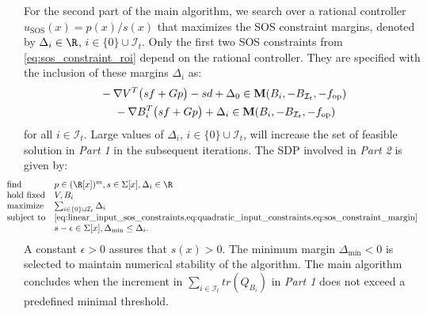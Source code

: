 For the second part of the main algorithm, we search over a rational controller $u_\text{SOS}(x) = p(x)/s(x)$ that maximizes the SOS constraint margins, denoted by $\Delta_i \in \R$, $i \in \{ 0 \} \cup \mathcal I_t$.
Only the first two SOS constraints from \cref{eq:sos_constraint_roi} depend on the rational controller.
They are specified with the inclusion of these margins $\Delta_i$ as:
\begin{subequations} \label{eq:sos_constraint_margin}
   \begin{align}
      \begin{split}
         &-\nabla V^T \bigl ( s f + G p \bigr ) - s d + \Delta_0 \in \textbf M(B_i, -B_{\mathcal I_t}, -f_\text{op}) \\
      \end{split} \\
      \begin{split}
         &-\nabla B_i^T \bigl ( s f + G p \bigr ) + \Delta_i \in \textbf M(B_i, -B_{\mathcal I_t}, -f_\text{op})
      \end{split}
   \end{align}
\end{subequations}
for all $i \in \mathcal I_t$.
Large values of $\Delta_i$, $i \in \{ 0 \} \cup \mathcal I_t$, will increase the set of feasible solution in \textit{Part 1} in the subsequent iterations.
The SDP involved in \textit{Part 2} is given by:
\begin{align} \label{eq:sos_opt_prob_part2}
   \hspace{-\leftmargin}
   \begin{array}{lll}
      \mbox{find} & p \in (\R[x])^m, s \in \Sigma[x], \Delta_i \in \R \\
      \mbox{hold fixed} & V, B_i \\
      \mbox{maximize} & \sum_{i \in \{0\} \cup \mathcal I_t} \Delta_i \\
      \mbox{subject to} & \text{\cref{eq:linear_input_sos_constraints,eq:quadratic_input_constraints,eq:sos_constraint_margin}} \\
      & s - \epsilon \in \Sigma[x], \Delta_\text{min} \leq \Delta_i.
   \end{array}
\end{align}
A constant $\epsilon > 0$ assures that $s(x) > 0$.
The minimum margin $\Delta_\text{min} < 0$ is selected to maintain numerical stability of the algorithm.
The main algorithm concludes when the increment in $\sum_{i \in \mathcal I_t} tr(Q_{B_i})$ in \textit{Part 1} does not exceed a predefined minimal threshold.




